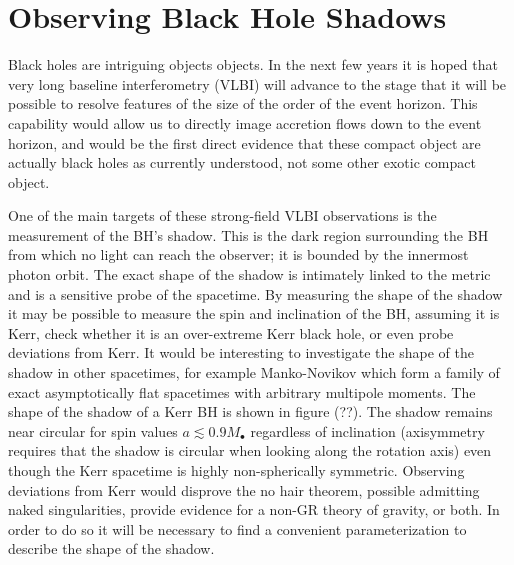 \section{Observing Black Hole Shadows}

Black holes are intriguing objects objects. In the next few years it is hoped that very long baseline interferometry (VLBI) will advance to the stage that it will be possible to resolve features of the size of the order of the event horizon\cite{Doeleman2008}. This capability would allow us to directly image accretion flows down to the event horizon, and would be the first direct evidence that these compact object are actually black holes as currently understood, not some other exotic compact object.

One of the main targets of these strong-field VLBI observations is the measurement of the BH's shadow. This is the dark region surrounding the BH from which no light can reach the observer; it is bounded by the innermost photon orbit\cite{Chandrasekhar1998}. The exact shape of the shadow is intimately linked to the metric and is a sensitive probe of the spacetime. By measuring the shape of the shadow it may be possible to measure the spin and inclination of the BH\cite{Hioki2009a}, assuming it is Kerr, check whether it is an over-extreme Kerr black hole\cite{Bambi2009}, or even probe deviations from Kerr\cite{Johannsen2010a, Johannsen2010b}. It would be interesting to investigate the shape of the shadow in other spacetimes, for example Manko-Novikov\cite{Manko1992, Gair2008a} which form a family of exact asymptotically flat spacetimes with arbitrary multipole moments. The shape of the shadow of a Kerr BH is shown in figure (??). The shadow remains near circular for spin values $a \lesssim 0.9 M_\bullet$ regardless of inclination (axisymmetry requires that the shadow is circular when looking along the rotation axis) even though the Kerr spacetime is highly non-spherically symmetric\cite{Johannsen2010b}. Observing deviations from Kerr would disprove the no hair theorem, possible admitting naked singularities, provide evidence for a non-GR theory of gravity, or both. In order to do so it will be necessary to find a convenient parameterization to describe the shape of the shadow.
